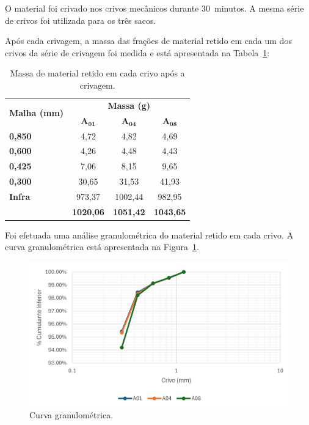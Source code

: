 O material foi crivado nos crivos mecânicos durante 30~minutos.
A mesma série de crivos foi utilizada para os três sacos.

Após cada crivagem, a massa das frações de material retido em cada um dos crivos da série de crivagem foi medida e está apresentada na Tabela~\ref{tab:massa_retido_crivagem}:

\begin{table}[!htb]
    \centering
    \begin{tabular}{@{}lccc@{}}
        \toprule
        \multirow{2}{*}{\textbf{Malha (mm)}} & \multicolumn{3}{c}{\textbf{Massa (g)}} \\ \cmidrule(lr){2-4}
         & \multicolumn{1}{c}{\textbf{A$\bm{_{01}}$}} & \multicolumn{1}{c}{\textbf{A$\bm{_{04}}$}} & \textbf{A$\bm{_{08}}$} \\ \hline
        \textbf{0,850} & \multicolumn{1}{c}{4,72} & \multicolumn{1}{c}{4,82} & 4,69 \\
        \textbf{0,600} & \multicolumn{1}{c}{4,26} & \multicolumn{1}{c}{4,48} & 4,43 \\
        \textbf{0,425} & \multicolumn{1}{c}{7,06} & \multicolumn{1}{c}{8,15} & 9,65 \\
        \textbf{0,300} & \multicolumn{1}{c}{30,65} & \multicolumn{1}{c}{31,53} & 41,93 \\
        \textbf{Infra} & \multicolumn{1}{c}{973,37} & \multicolumn{1}{c}{1002,44} & 982,95 \\ \midrule
        \textbf{\bm{$\sum$}}& \multicolumn{1}{c}{\textbf{1020,06}} & \multicolumn{1}{c}{\textbf{1051,42}} & \textbf{1043,65} \\ \bottomrule
    \end{tabular}
    \caption{Massa de material retido em cada crivo após a crivagem.}
    \label{tab:massa_retido_crivagem}
\end{table}

\newpara

Foi efetuada uma análise granulométrica do material retido em cada crivo.
A curva granulométrica está apresentada na Figura~\ref{fig:curva_granulometrica}.
\begin{figure}[!htb]
    \centering
    \includegraphics[width=0.9\linewidth]{figures/curva_granulometrica}
    \caption{Curva granulométrica.}
    \label{fig:curva_granulometrica}
\end{figure}


